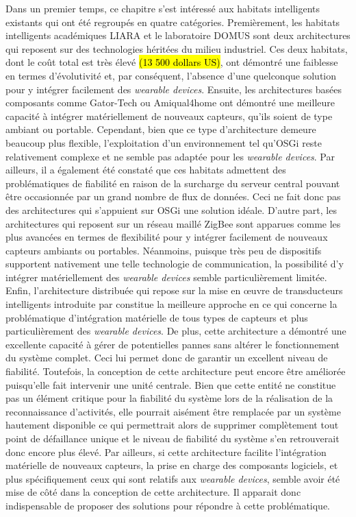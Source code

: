 Dans un premier temps, ce chapitre s'est intéressé aux habitats intelligents existants qui ont été regroupés en quatre catégories. Premièrement, les habitats intelligents académiques \acs{LIARA} et le laboratoire \acs{DOMUS} sont deux architectures qui reposent sur des technologies héritées du milieu industriel. Ces deux habitats, dont le coût total est très élevé \hl{(13 500 dollars US)}, ont démontré une faiblesse en termes d'évolutivité et, par conséquent, l'absence d'une quelconque solution pour y intégrer facilement des \textit{wearable devices}. Ensuite, les architectures basées composants comme Gator-Tech ou Amiqual4home ont démontré une meilleure capacité à intégrer matériellement de nouveaux capteurs, qu'ils soient de type ambiant ou portable. Cependant, bien que ce type d'architecture demeure beaucoup plus flexible, l'exploitation d'un environnement tel qu'\acs{OSGi} reste relativement complexe et ne semble pas adaptée pour les \textit{wearable devices}. Par ailleurs, il a également été constaté que ces habitats admettent des problématiques de fiabilité en raison de la surcharge du serveur central pouvant être occasionnée par un grand nombre de flux de données. Ceci ne fait donc pas des architectures qui s'appuient sur \acs{OSGi} une solution idéale. D'autre part, les architectures qui reposent sur un réseau maillé ZigBee sont apparues comme les plus avancées en termes de flexibilité pour y intégrer facilement de nouveaux capteurs ambiants ou portables. Néanmoins, puisque très peu de dispositifs supportent nativement une telle technologie de communication, la possibilité d'y intégrer matériellement des \textit{wearable devices} semble particulièrement limitée. Enfin, l'architecture distribuée qui repose sur la mise en \oe{}uvre de transducteurs intelligents introduite par \cite{Plantevin2018} constitue la meilleure approche en ce qui concerne la problématique d'intégration matérielle de tous types de capteurs et plus particulièrement des \textit{wearable devices}. De plus, cette architecture a démontré une excellente capacité à gérer de potentielles pannes sans altérer le fonctionnement du système complet. Ceci lui permet donc de garantir un excellent niveau de fiabilité. Toutefois, la conception de cette architecture peut encore être améliorée puisqu'elle fait intervenir une unité centrale. Bien que cette entité ne constitue pas un élément critique pour la fiabilité du système lors de la réalisation de la reconnaissance d'activités, elle pourrait aisément être remplacée par un système hautement disponible ce qui permettrait alors de supprimer complètement tout point de défaillance unique et le niveau de fiabilité du système s'en retrouverait donc encore plus élevé. Par ailleurs, si cette architecture facilite l'intégration matérielle de nouveaux capteurs, la prise en charge des composants logiciels, et plus spécifiquement ceux qui sont relatifs aux \textit{wearable devices}, semble avoir été mise de côté dans la conception de cette architecture. Il apparait donc indispensable de proposer des solutions pour répondre à cette problématique.


